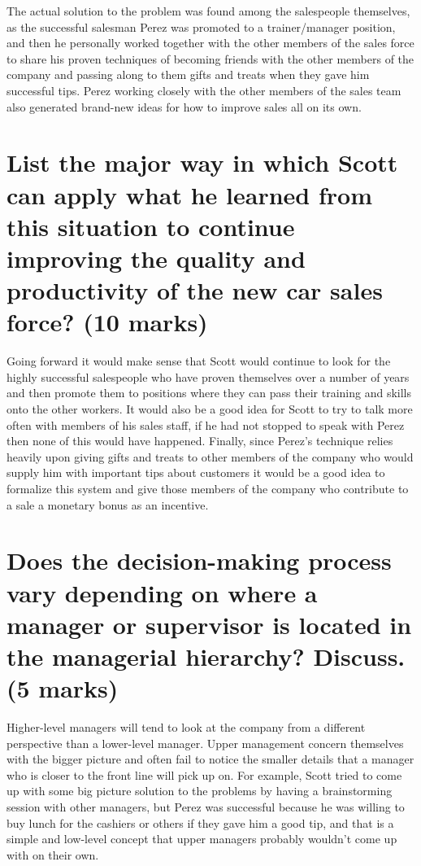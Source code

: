 \documentclass[12pt,titlepage]{article}
\begin{document}
The actual solution to the problem was found among the salespeople themselves, as the successful salesman Perez was promoted to a trainer/manager position, and then he personally worked together with the other members of the sales force to share his proven techniques of becoming friends with the other members of the company and passing along to them gifts and treats when they gave him successful tips. Perez working closely
with the other members of the sales team also generated brand-new ideas for how to improve sales all on its own.

\section{List the major way in which Scott can apply what he learned from this situation to continue improving the quality and productivity of the new car sales force? (10 marks)}

Going forward it would make sense that Scott would continue to look for the highly successful salespeople who have proven themselves over a number of years and then promote them to positions where they can pass their training and skills onto the other workers. It would also be a good idea for Scott to try to talk more often with members of his sales staff, if he had not stopped to speak with Perez then none of this would have happened. Finally, since Perez's technique relies heavily upon giving gifts and treats to other members of the company who would supply him with important tips about customers it would
be a good idea to formalize this system and give those members of
the company who contribute to a sale a monetary bonus as an incentive.

\section{Does the decision-making process vary depending on where a manager or supervisor is located in the managerial hierarchy? Discuss. (5 marks)}

Higher-level managers will tend to look at the company from a different perspective than a lower-level manager. Upper management concern themselves with the bigger picture and often fail to notice the smaller details that a manager who is closer to the front line will pick up on. For example, Scott tried to come up with some big picture solution to the problems by having a brainstorming session with other managers, but Perez was successful because he was willing to buy lunch for the cashiers or others if they gave him a good tip, and that is a simple
and low-level concept that upper managers probably wouldn't come up with on their own.
\end{document}
